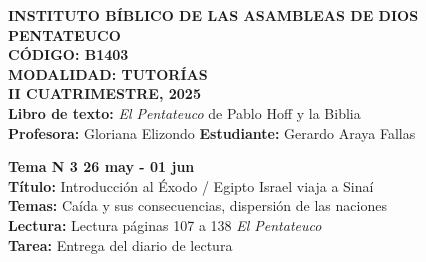 \documentclass[12pt]{article}
\begin{document}
\begin{center}
    \textbf{\Large INSTITUTO BÍBLICO DE LAS ASAMBLEAS DE DIOS} \\[0.5em]
    \textbf{\Large PENTATEUCO} \\[0.3em]
    \textbf{CÓDIGO: B1403} \\[0.3em]
    \textbf{MODALIDAD: TUTORÍAS} \\[0.3em]
    \textbf{II CUATRIMESTRE, 2025} \\[1em]
    \textbf{Libro de texto:} \textit{El Pentateuco} de Pablo Hoff y la Biblia \\[1em]
    \textbf{Profesora:} Gloriana Elizondo \hspace{2cm} \textbf{Estudiante:} Gerardo Araya Fallas
\end{center}

\vspace{1cm}

\noindent
\textbf{Tema N\textordmasculine{} 3 \hfill 26 may - 01 jun} \\
\textbf{Título:} Introducción al Éxodo / Egipto Israel viaja a Sinaí \\
\textbf{Temas:} Caída y sus consecuencias, dispersión de las naciones \\
\textbf{Lectura:} Lectura páginas 107 a 138 \textit{El Pentateuco} \\
\textbf{Tarea:} Entrega del diario de lectura
\end{document}
